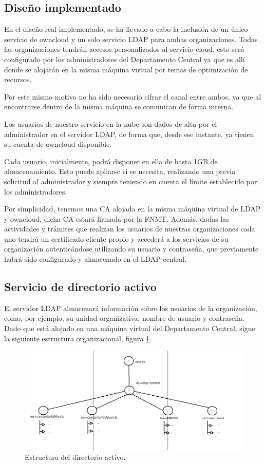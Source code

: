 \documentclass[a4paper]{article}
\begin{document}
\newpage
\subsection{Diseño implementado}
En el diseño real implementado, se ha llevado a cabo la inclusión de un único servicio
de owncloud y un solo servicio LDAP para ambas organizaciones. Todas las organizaciones tendrán accesos personalizados al servicio cloud, esto será configurado por los administradores del Departamento Central ya que es allí donde se alojarán en la misma máquina virtual por temas de optimización de recursos. 

Por este mismo motivo no ha sido necesario cifrar el canal entre ambos, ya
que al encontrarse dentro de la misma máquina se comunican de forma interna.

Los usuarios de nuestro servicio en la nube son dados de alta por el administrador en el
servidor LDAP, de forma que, desde ese instante, ya tienen su cuenta de owncloud
disponible. 

Cada usuario, inicialmente, podrá disponer en ella de hasta 1GB de almacenamiento. Esto puede apliarse si se necesita, realizando una previa solicitud al administrador y siempre teniendo en cuenta el límite establecido por los administradores.

Por simplicidad, tenemos una CA alojada en la misma máquina virtual de LDAP y owncloud, dicha CA estará firmada por la FNMT. Además, dadas las actividades y trámites que realizan los usuarios de nuestras organizaciones cada uno tendrá un certificado cliente propio y accederá a los servicios de su organización autenticándose utilizando su usuario y contraseña, que previamente habrá sido configurado y almacenado en el LDAP central.

\subsection{Servicio de directorio activo}
El servidor LDAP almacenará información sobre los usuarios de la organización, como, por ejemplo, su unidad organizativa, nombre de usuario y contraseña. Dado que está alojado en una máquina virtual del Departamento Central, sigue la siguiente estructura organizacional, figura \ref{fig:ldap}.
\newpage

\begin{figure}[htb]
    \begin{center}
        \includegraphics[width=1\textwidth]{ldap.png}
        \caption{Estructura del directorio activo.}
         \label{fig:ldap}
    \end{center}
\end{figure}
\end{document}
